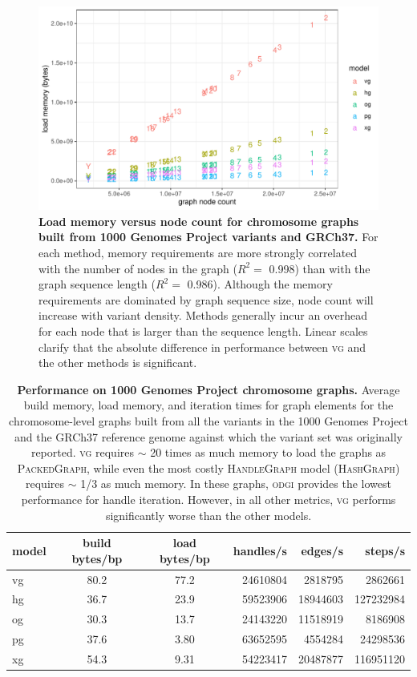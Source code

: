 \documentclass{article}
\begin{document}
\begin{figure}[p]
  \centering
  \includegraphics[width=1.0\textwidth]{figures/1000gp_chroms_node_count.pdf}
  \caption{
    \label{fig:1000GPchroms}
    \textbf{Load memory versus node count for chromosome graphs built from 1000 Genomes Project variants and GRCh37.}
    For each method, memory requirements are more strongly correlated with the number of nodes in the graph ($R^2 =$ 0.998) than with the graph sequence length ($R^2 =$ 0.986).
    Although the memory requirements are dominated by graph sequence size, node count will increase with variant density.
    Methods generally incur an overhead for each node that is larger than the sequence length.
    Linear scales clarify that the absolute difference in performance between \textsc{vg} and the other methods is significant.
    }
\end{figure}

\begin{table}
  \centering
\begin{tabular}{l||c|c|r|r|r}
model & build bytes/bp & load bytes/bp & handles/s & edges/s & steps/s \\
\hline
vg &   80.2 &   77.2  &   24610804 &    2818795 &     2862661 \\
hg &   36.7 &   23.9  &   59523906 &   18944603 &   127232984 \\
og &   30.3 &   13.7  &   24143220 &   11518919 &     8186908 \\
pg &   37.6 &   3.80  &   63652595 &    4554284 &    24298536 \\
xg &   54.3 &   9.31  &   54223417 &   20487877 &   116951120 \\
\hline
\end{tabular}
\caption{
  \textbf{Performance on 1000 Genomes Project chromosome graphs.}
  Average build memory, load memory, and iteration times for graph elements for the chromosome-level graphs built from all the variants in the 1000 Genomes Project and the GRCh37 reference genome against which the variant set was originally reported.
  \textsc{vg} requires $\sim$ 20 times as much memory to load the graphs as \textsc{PackedGraph}, while even the most costly \textsc{HandleGraph} model (\textsc{HashGraph}) requires $\sim$ 1/3 as much memory.
  In these graphs, \textsc{odgi} provides the lowest performance for handle iteration.
  However, in all other metrics, \textsc{vg} performs significantly worse than the other models.
}
\label{table:1000GPchroms}
\end{table}
\end{document}
